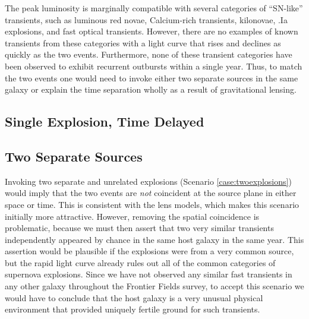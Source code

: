 The peak luminosity is marginally compatible with several categories
of ``SN-like'' transients, such as luminous red novae, Calcium-rich
transients, kilonovae, .Ia explosions, and fast optical transients.
However, there are no examples of known transients from these
categories with a light curve that rises and declines as quickly as
the two \spock events.  Furthermore, none of these transient
categories have been observed to exhibit recurrent outbursts within a
single year. Thus, to match the two \spock events one would need to
invoke either two separate sources in the same galaxy or explain the
time separation wholly as a result of gravitational lensing.





\subsection{Single Explosion, Time Delayed}




\subsection{Two Separate Sources}

Invoking two separate and unrelated explosions (Scenario
\ref{case:twoexplosions}) would imply that the two events are {\it
  not} coincident at the source plane in either space or time.  This
is consistent with the lens models, which makes this scenario
initially more attractive.  However, removing the spatial coincidence
is problematic, because we must then assert that two very similar
transients independently appeared by chance in the same host galaxy in
the same year.  This assertion would be plausible if the explosions
were from a very common source, but the rapid light curve already
rules out all of the common categories of supernova explosions.  Since
we have not observed any similar fast transients in any other galaxy
throughout the Frontier Fields survey, to accept this scenario we
would have to conclude that the \spock host galaxy is a very unusual
physical environment that provided uniquely fertile ground for such
transients.




